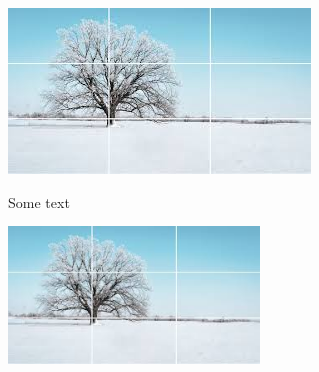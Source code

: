 \documentclass{article}
\begin{document}
\begin{center}
\includegraphics[height = 0.5\textheight]{example-image}
\end{center}
Some text
\begin{center}
\includegraphics[width = 0.5\textwidth]{example-image}
\end{center}
\end{document}
